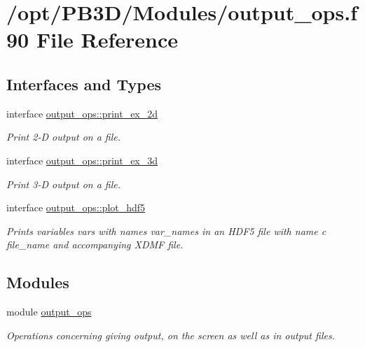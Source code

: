 \hypertarget{output__ops_8f90}{}\section{/opt/\+P\+B3\+D/\+Modules/output\+\_\+ops.f90 File Reference}
\label{output__ops_8f90}
\subsection*{Interfaces and Types}
\begin{DoxyCompactItemize}
\item 
interface \hyperlink{interfaceoutput__ops_1_1print__ex__2d}{output\+\_\+ops\+::print\+\_\+ex\+\_\+2d}
\begin{DoxyCompactList}\small\item\em Print 2-\/D output on a file. \end{DoxyCompactList}\item 
interface \hyperlink{interfaceoutput__ops_1_1print__ex__3d}{output\+\_\+ops\+::print\+\_\+ex\+\_\+3d}
\begin{DoxyCompactList}\small\item\em Print 3-\/D output on a file. \end{DoxyCompactList}\item 
interface \hyperlink{interfaceoutput__ops_1_1plot__hdf5}{output\+\_\+ops\+::plot\+\_\+hdf5}
\begin{DoxyCompactList}\small\item\em Prints variables {\ttfamily vars} with names {\ttfamily var\+\_\+names} in an H\+D\+F5 file with name c file\+\_\+name and accompanying X\+D\+MF file. \end{DoxyCompactList}\end{DoxyCompactItemize}
\subsection*{Modules}
\begin{DoxyCompactItemize}
\item 
module \hyperlink{namespaceoutput__ops}{output\+\_\+ops}
\begin{DoxyCompactList}\small\item\em Operations concerning giving output, on the screen as well as in output files. \end{DoxyCompactList}\end{DoxyCompactItemize}
